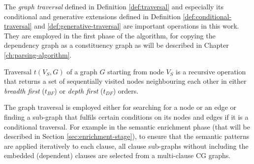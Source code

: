 
%

    The \textit{graph traversal} defined in Definition \ref{def:traversal} and especially its conditional and generative extensions defined in Definition \ref{def:conditional-traversal} and \ref{def:generative-traversal} are  important operations in this work. They are employed in the first phase of the algorithm, for copying the dependency graph as a constituency graph as will be described in Chapter \ref{ch:parsing-algorithm}.

    \begin{definition}[Traversal]\label{def:traversal}
        Traversal $t(V_S,G)$ of a graph $G$ starting from node $V_S$ is a recursive operation that returns a set of sequentially visited nodes neighbouring each other in either \textit{breadth first} ($t_{BF}$) or \textit{depth first} ($t_{DF}$) orders.
    \end{definition}

    The graph traversal is employed either for searching for a node or an edge or finding a sub-graph that fulfils certain conditions on its nodes and edges if it is a conditional traversal. For example in the semantic enrichment phase (that will be described in Section \ref{sec:enrichment-stage}), to ensure that the semantic patterns are applied iteratively to each clause, all clause sub-graphs without including the embedded (dependent) clauses are selected from a multi-clause CG graphs. 

